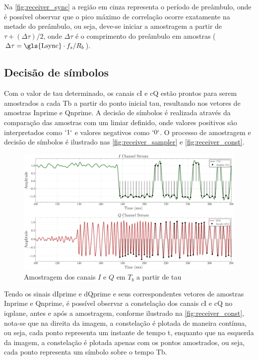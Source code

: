 Na \autoref{fig:receiver_sync} a região em cinza representa o período de preâmbulo, onde é possível observar que o pico máximo de correlação ocorre exatamente na metade do preâmbulo, ou seja, deve-se iniciar a amostragem a partir de $\tau + (\Delta \tau)/2$, onde $\Delta \tau$ é o comprimento do preâmbulo em amostras ($\Delta \tau = \text{\gls{Lsync}} \cdot f_s/R_b$). 

\subsection{Decisão de símbolos}\label{sec:decisao_simbolos}

Com o valor de \gls{tau} determinado, os canais \gls{cI} e \gls{cQ} estão prontos para serem amostrados a cada \gls{Tb} a partir do ponto inicial \gls{tau}, resultando nos vetores de amostras \gls{Inprime} e \gls{Qnprime}. A decisão de símbolos é realizada através da comparação das amostras com um limiar definido, onde valores positivos são interpretados como $`1`$ e valores negativos como $`0`$. O processo de amostragem e decisão de símbolos é ilustrado nas \autoref{fig:receiver_sampler} e \autoref{fig:receiver_const}.

\begin{figure}[H]
	\centering
	\caption{Amostragem dos canais $I$ e $Q$ em $T_b$ a partir de \gls{tau}}\label{fig:receiver_sampler}
	\includegraphics[width=\linewidth]{assets/cap3/receiver_sampler_time.pdf}
\end{figure}

Tendo os sinais \gls{dIprime} e \gls{dQprime} e seus correspondentes vetores de amostras \gls{Inprime} e \gls{Qnprime}, é possível observar a constelação dos canais \gls{cI} e \gls{cQ} no \gls{iqplane}, antes e após a amostragem, conforme ilustrado na \autoref{fig:receiver_const}, nota-se que na direita da imagem, a constelação é plotada de maneira contínua, ou seja, cada ponto representa um instante de tempo \gls{t}, enquanto que na esquerda da imagem, a constelação é plotada apenas com os pontos amostrados, ou seja, cada ponto representa um símbolo sobre o tempo \gls{Tb}. 

